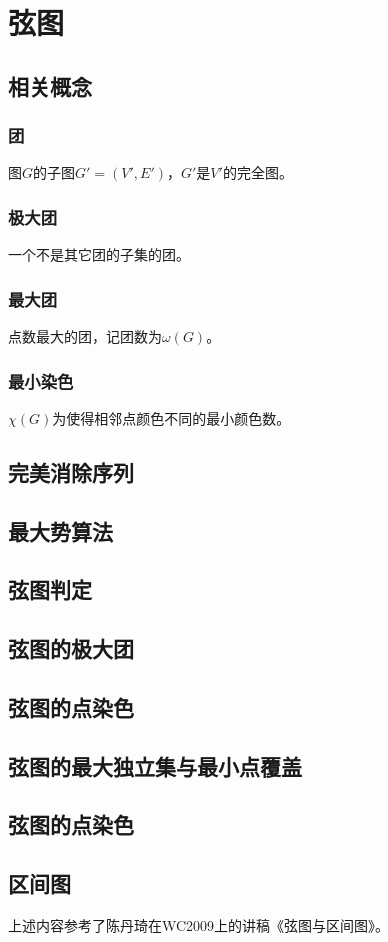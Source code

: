 \section{弦图}
\subsection{相关概念}
\subsubsection{团}
图$G$的子图$G'=(V',E')$，$G'$是$V'$的完全图。
\subsubsection{极大团}
一个不是其它团的子集的团。
\subsubsection{最大团}
点数最大的团，记团数为$\omega(G)$。
\subsubsection{最小染色}
$\chi(G)$为使得相邻点颜色不同的最小颜色数。

\subsection{完美消除序列}
\subsection{最大势算法}
\subsection{弦图判定}
\subsection{弦图的极大团}
\subsection{弦图的点染色}
\subsection{弦图的最大独立集与最小点覆盖}
\subsection{弦图的点染色}
\subsection{区间图}
上述内容参考了陈丹琦在WC2009上的讲稿《弦图与区间图》\cite{chord}。

